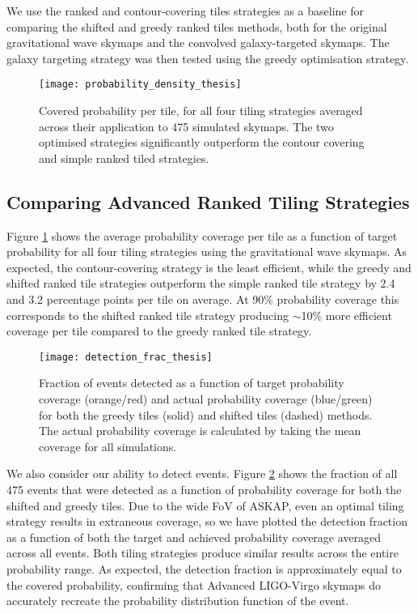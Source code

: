 We use the ranked and contour-covering tiles strategies as a baseline for comparing the shifted and greedy ranked tiles methods, both for the original gravitational wave skymaps and the convolved galaxy-targeted skymaps. The galaxy targeting strategy was then tested using the greedy optimisation strategy.

\begin{figure}[h!]
	\texttt{[image: probability\_density\_thesis]}
	\caption[Coverage efficiency of four tiling strategies]{Covered probability per tile, for all four tiling strategies averaged across their application to 475 simulated skymaps. The two optimised strategies significantly outperform the contour covering and simple ranked tiled strategies.}
	\label{fig:coverage_density}
\end{figure}

\subsection{Comparing Advanced Ranked Tiling Strategies}
Figure \ref{fig:coverage_density} shows the average probability coverage per tile as a function of target probability for all four tiling strategies using the gravitational wave skymaps. As expected, the contour-covering strategy is the least efficient, while the greedy and shifted ranked tile strategies outperform the simple ranked tile strategy by 2.4 and 3.2 percentage points per tile on average. At 90\% probability coverage this corresponds to the shifted ranked tile strategy producing $\sim$10\% more efficient coverage per tile compared to the greedy ranked tile strategy.

\begin{figure}
	\texttt{[image: detection\_frac\_thesis]}
	\caption[Detection effiency of two ranked tiling strategies]{Fraction of events detected  as a function of target probability coverage (orange/red) and actual probability coverage (blue/green) for both the greedy tiles (solid) and shifted tiles (dashed) methods. The actual probability coverage is calculated by taking the mean coverage for all simulations.}
	\label{fig:detection_frac}
\end{figure}

We also consider our ability to detect events. Figure \ref{fig:detection_frac} shows the fraction of all 475 events that were detected as a function of probability coverage for both the shifted and greedy tiles. Due to the wide FoV of ASKAP, even an optimal tiling strategy results in extraneous coverage, so we have plotted the detection fraction as a function of both the target and achieved probability coverage averaged across all events. Both tiling strategies produce similar results across the entire probability range. As expected, the detection fraction is approximately equal to the covered probability, confirming that Advanced LIGO-Virgo skymaps do accurately recreate the probability distribution function of the event.

